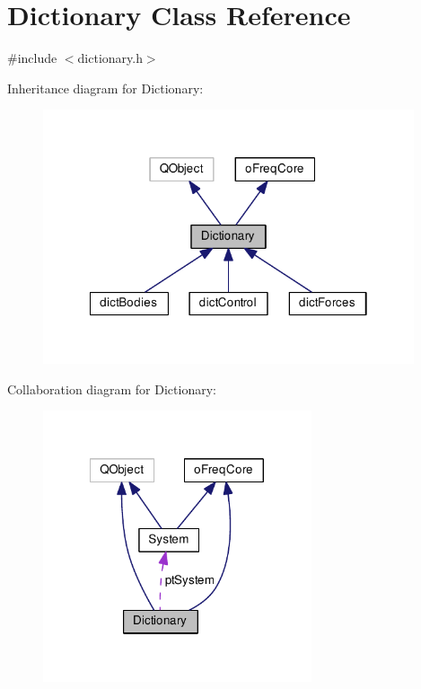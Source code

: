 \hypertarget{class_dictionary}{\section{Dictionary Class Reference}
\label{class_dictionary}
}


{\ttfamily \#include $<$dictionary.\-h$>$}



Inheritance diagram for Dictionary\-:\nopagebreak
\begin{figure}[H]
\begin{center}
\leavevmode
\includegraphics[width=310pt]{class_dictionary__inherit__graph}
\end{center}
\end{figure}


Collaboration diagram for Dictionary\-:\nopagebreak
\begin{figure}[H]
\begin{center}
\leavevmode
\includegraphics[width=224pt]{class_dictionary__coll__graph}
\end{center}
\end{figure}
